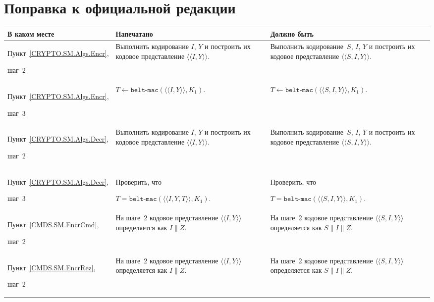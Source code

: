 \clearpage
\chapter*{\mbox{}\hfill Поправка к официальной редакции\hfill\mbox{}}

\mbox{}

\begin{center}
\begin{tabular}{|p{3.5cm}|p{6cm}|p{6cm}|}
\hline
В каком месте & Напечатано & Должно быть\\
\hline
\hline
Пункт~\ref{CRYPTO.SM.Algs.Encr},\par шаг~2 &
Выполнить кодирование $I$, $Y$ и построить их кодовое 
представление $\langle\langle I, Y\rangle\rangle$.
&
Выполнить кодирование~$S$, $I$, $Y$ и построить их кодовое 
представление $\langle\langle S, I, Y\rangle\rangle$.
\\
\hline
Пункт~\ref{CRYPTO.SM.Algs.Encr},\par шаг~3 &
$T\gets\texttt{belt-mac}(\langle\langle I, Y\rangle\rangle, K_1)$.
&
$T\gets\texttt{belt-mac}(\langle\langle S, I, Y\rangle\rangle, K_1)$.
\\
\hline
Пункт~\ref{CRYPTO.SM.Algs.Decr},\par шаг~2 &
Выполнить кодирование $I$, $Y$ и построить их кодовое 
представление $\langle\langle I, Y\rangle\rangle$.
&
Выполнить кодирование~$S$, $I$, $Y$ и построить их кодовое 
представление $\langle\langle S, I, Y\rangle\rangle$.
\\
\hline
Пункт~\ref{CRYPTO.SM.Algs.Decr},\par шаг~3 &
Проверить, что\par 
$T=\texttt{belt-mac}(\langle\langle I, Y, T\rangle\rangle, K_1)$. 
&
Проверить, что\par 
$T=\texttt{belt-mac}(\langle\langle S, I, Y\rangle\rangle, K_1)$.
\\
\hline
Пункт~\ref{CMDS.SM.EncrCmd},\par шаг~2 &
На шаге~2 кодовое представление $\langle\langle I,Y\rangle\rangle$
определяется как $I\parallel Z$.
&
На шаге~2 кодовое представление $\langle\langle S,I,Y\rangle\rangle$
определяется как $S\parallel I\parallel Z$.
\\
\hline
Пункт~\ref{CMDS.SM.EncrRez},\par шаг~2 &
На шаге~2 кодовое представление $\langle\langle I,Y\rangle\rangle$
определяется как $I\parallel Z$.
&
На шаге~2 кодовое представление $\langle\langle S,I,Y\rangle\rangle$
определяется как $S\parallel I\parallel Z$.
\\
\hline
\end{tabular}
\end{center}